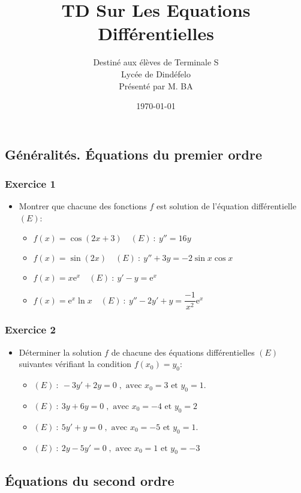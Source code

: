 \documentclass[12pt]{article}
\author{Destiné aux élèves de Terminale S\\Lycée de Dindéfelo\\Présenté par M. BA}
\title{\textbf{TD Sur Les Equations Différentielles}}
\date{\today}
\begin{document}
\maketitle
\newpage
\subsection*{Généralités. Équations du premier ordre}
\subsubsection*{Exercice 1}
\begin{itemize}
    \item Montrer que chacune des fonctions \(f\) est solution de l'équation différentielle \((E)\):
    \begin{itemize}
        \item \(f(x)=\cos(2x+3)\quad(E)\ :\  y''=16y\)
        \item \(f(x)=\sin(2x)\quad(E)\ :\  y''+3y=-2\sin x\cos x\)
        \item \(f(x)=x\mathrm{e}^{x}\quad(E)\ :\  y'-y=\mathrm{e}^{x}\)
        \item \(f(x)=\mathrm{e}^{x}\ln x\quad(E)\ :\  y''-2y'+y=\dfrac{-1}{x^{2}}\mathrm{e}^{x}\)
    \end{itemize}
\end{itemize}
\subsubsection*{Exercice 2}
\begin{itemize}
    \item Déterminer la solution \(f\) de chacune des équations différentielles \((E)\) suivantes vérifiant la condition \(f(x_{0})=y_{0}\):
    \begin{itemize}
        \item \((E)\ :\ -3y'+2y=0\;,\text{ avec }x_{0}=3\text{ et }y_{0}=1.\)
        \item \((E)\ :\ 3y+6y=0\;,\text{ avec }x_{0}=-4\text{ et }y_{0}=2\)
        \item \((E)\ :\ 5y'+y=0\;,\text{ avec }x_{0}=-5\text{ et }y_{0}=1.\)
        \item \((E)\ :\ 2y-5y'=0\;,\text{ avec }x_{0}=1\text{ et }y_{0}=-3\)
    \end{itemize}
\end{itemize}

\subsection*{Équations du second ordre}
\end{document}
